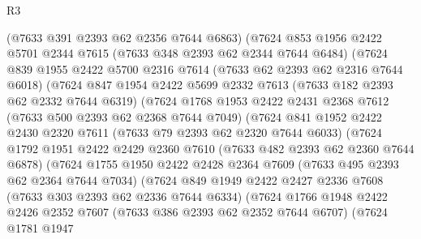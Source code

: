 \begin{lexlean}{R3}
\begin{coremodule}
              (@7633 @391 @2393 @62 @2356 @7644 @6863)
              (@7624
                @853
                @1956
                @2422
                @5701
                @2344
                @7615
                (@7633 @348 @2393 @62 @2344 @7644 @6484)
                (@7624
                  @839
                  @1955
                  @2422
                  @5700
                  @2316
                  @7614
                  (@7633 @62 @2393 @62 @2316 @7644 @6018)
                  (@7624
                    @847
                    @1954
                    @2422
                    @5699
                    @2332
                    @7613
                    (@7633 @182 @2393 @62 @2332 @7644 @6319)
                    (@7624
                      @1768
                      @1953
                      @2422
                      @2431
                      @2368
                      @7612
                      (@7633 @500 @2393 @62 @2368 @7644 @7049)
                      (@7624
                        @841
                        @1952
                        @2422
                        @2430
                        @2320
                        @7611
                        (@7633 @79 @2393 @62 @2320 @7644 @6033)
                        (@7624
                          @1792
                          @1951
                          @2422
                          @2429
                          @2360
                          @7610
                          (@7633 @482 @2393 @62 @2360 @7644 @6878)
                          (@7624
                            @1755
                            @1950
                            @2422
                            @2428
                            @2364
                            @7609
                            (@7633 @495 @2393 @62 @2364 @7644 @7034)
                            (@7624
                              @849
                              @1949
                              @2422
                              @2427
                              @2336
                              @7608
                              (@7633 @303 @2393 @62 @2336 @7644 @6334)
                              (@7624
                                @1766
                                @1948
                                @2422
                                @2426
                                @2352
                                @7607
                                (@7633 @386 @2393 @62 @2352 @7644 @6707)
                                (@7624
                                  @1781
                                  @1947

\end{coremodule}
\end{lexlean}
